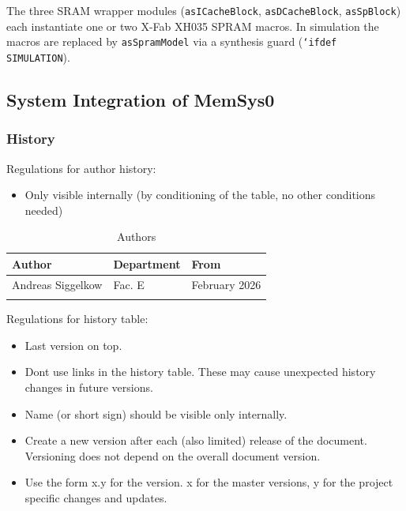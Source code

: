 The three SRAM wrapper modules (\texttt{asICacheBlock}, \texttt{asDCacheBlock},
\texttt{asSpBlock}) each instantiate one or two X-Fab XH035 SPRAM macros.
In simulation the macros are replaced by \texttt{asSpramModel} via a
synthesis guard (\texttt{`ifdef SIMULATION}).

\subsection{System Integration of MemSys0}
\subsubsection{History}
Regulations for author history:
\begin{itemize}
  \item Only visible internally (by conditioning of the table, no other conditions needed)
\end{itemize}

\begin{table}[H]
\caption{Authors}
\label{tab:memsysauth01a}
\centering
\begin{tabularx}{\textwidth}{|X |X |X |}
  \hline
  Author & Department & From \\
  \hline
  \hline
  Andreas Siggelkow & Fac. E & February 2026 \\
  \hline
  && \\
  \hline
\end{tabularx}
\end{table}

Regulations for history table:
\begin{itemize}
  \item Last version on top.
  \item Dont use links in the history table. These may cause unexpected history changes in future versions.
  \item Name (or short sign) should be visible only internally.
  \item Create a new version after each (also limited) release of the document. Versioning does not depend on the overall document version.
  \item Use the form x.y for the version. x for the master versions, y for the project specific changes and updates.
\end{itemize}

